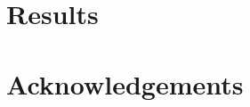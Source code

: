 \documentclass[10pt,a4paper,oneside]{article}
\begin{document}
	\section{Results}
	
	
	
	
	\section*{Acknowledgements}
	
	
	

	
\end{document}
